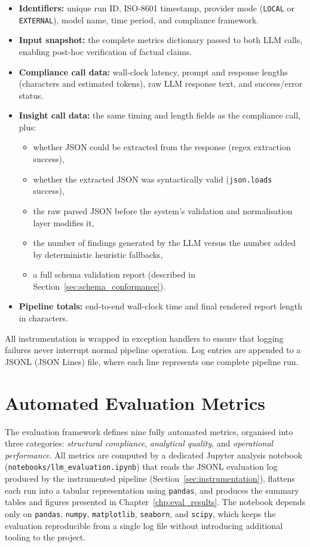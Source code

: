 \documentclass[]{UCD_CS_FYP_Report}
\begin{document}
\begin{itemize}
    \item \textbf{Identifiers:} unique run ID, ISO-8601 timestamp, provider mode (\texttt{LOCAL} or \texttt{EXTERNAL}), model name, time period, and compliance framework.
    \item \textbf{Input snapshot:} the complete metrics dictionary passed to both LLM calls, enabling post-hoc verification of factual claims.
    \item \textbf{Compliance call data:} wall-clock latency, prompt and response lengths (characters and estimated tokens), raw LLM response text, and success/error status.
    \item \textbf{Insight call data:} the same timing and length fields as the compliance call, plus:
    \begin{itemize}
        \item whether JSON could be extracted from the response (regex extraction success),
        \item whether the extracted JSON was syntactically valid (\texttt{json.loads} success),
        \item the raw parsed JSON before the system's validation and normalisation layer modifies it,
        \item the number of findings generated by the LLM versus the number added by deterministic heuristic fallbacks,
        \item a full schema validation report (described in Section~\ref{sec:schema_conformance}).
    \end{itemize}
    \item \textbf{Pipeline totals:} end-to-end wall-clock time and final rendered report length in characters.
\end{itemize}

All instrumentation is wrapped in exception handlers to ensure that logging failures never interrupt normal pipeline operation. Log entries are appended to a JSONL (JSON Lines) file, where each line represents one complete pipeline run.

\section{Automated Evaluation Metrics}
\label{sec:eval_metrics}

The evaluation framework defines nine fully automated metrics, organised into three categories: \textit{structural compliance}, \textit{analytical quality}, and \textit{operational performance}. All metrics are computed by a dedicated Jupyter analysis notebook (\texttt{notebooks/llm\_evaluation.ipynb}) that reads the JSONL evaluation log produced by the instrumented pipeline (Section~\ref{sec:instrumentation}), flattens each run into a tabular representation using \texttt{pandas}, and produces the summary tables and figures presented in Chapter~\ref{chp:eval_results}. The notebook depends only on \texttt{pandas}, \texttt{numpy}, \texttt{matplotlib}, \texttt{seaborn}, and \texttt{scipy}, which keeps the evaluation reproducible from a single log file without introducing additional tooling to the project.
\end{document}
